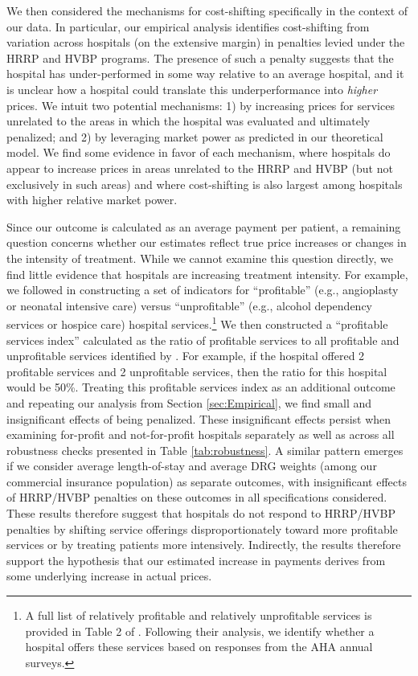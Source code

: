 \documentclass[12pt]{article}
\begin{document}
We then considered the mechanisms for cost-shifting specifically in the context of our data. In particular, our empirical analysis identifies cost-shifting from variation across hospitals (on the extensive margin) in penalties levied under the HRRP and HVBP programs. The presence of such a penalty suggests that the hospital has under-performed in some way relative to an average hospital, and it is unclear how a hospital could translate this underperformance into \textit{higher} prices. We intuit two potential mechanisms: 1) by increasing prices for services unrelated to the areas in which the hospital was evaluated and ultimately penalized; and 2) by leveraging market power as predicted in our theoretical model. We find some evidence in favor of each mechanism, where hospitals do appear to increase prices in areas unrelated to the HRRP and HVBP (but not exclusively in such areas) and where cost-shifting is also largest among hospitals with higher relative market power.

Since our outcome is calculated as an average payment per patient, a remaining question concerns whether our estimates reflect true price increases or changes in the intensity of treatment. While we cannot examine this question directly, we find little evidence that hospitals are increasing treatment intensity. For example, we followed \cite{horwitz2009} in constructing a set of indicators for ``profitable'' (e.g., angioplasty or neonatal intensive care) versus ``unprofitable'' (e.g., alcohol dependency services or hospice care) hospital services.\footnote{A full list of relatively profitable and relatively unprofitable services is provided in Table 2 of \cite{horwitz2009}. Following their analysis, we identify whether a hospital offers these services based on responses from the AHA annual surveys.} We then constructed a ``profitable services index'' calculated as the ratio of profitable services to all profitable and unprofitable services identified by \cite{horwitz2009}. For example, if the hospital offered 2 profitable services and 2 unprofitable services, then the ratio for this hospital would be 50\%. Treating this profitable services index as an additional outcome and repeating our analysis from Section \ref{sec:Empirical}, we find small and insignificant effects of being penalized. These insignificant effects persist when examining for-profit and not-for-profit hospitals separately as well as across all robustness checks presented in Table \ref{tab:robustness}. A similar pattern emerges if we consider average length-of-stay and average DRG weights (among our commercial insurance population) as separate outcomes, with insignificant effects of HRRP/HVBP penalties on these outcomes in all specifications considered. These results therefore suggest that hospitals do not respond to HRRP/HVBP penalties by shifting service offerings disproportionately toward more profitable services or by treating patients more intensively. Indirectly, the results therefore support the hypothesis that our estimated increase in payments derives from some underlying increase in actual prices.
\end{document}
